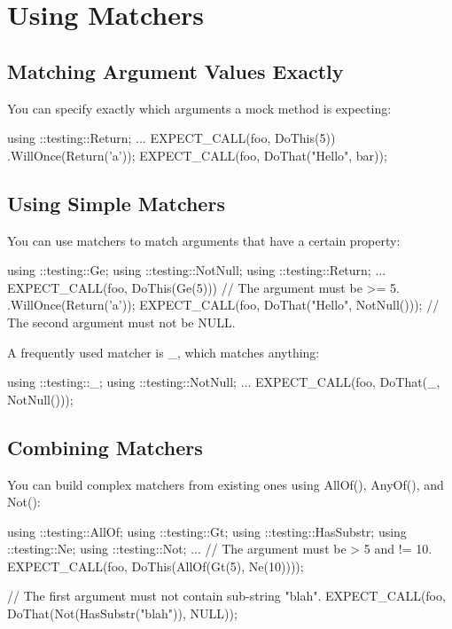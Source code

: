 \section*{Using Matchers}

\subsection*{Matching Argument Values Exactly}

You can specify exactly which arguments a mock method is expecting\+:


\begin{DoxyCode}
using ::testing::Return;
...
  EXPECT\_CALL(foo, DoThis(5))
      .WillOnce(Return('a'));
  EXPECT\_CALL(foo, DoThat("Hello", bar));
\end{DoxyCode}


\subsection*{Using Simple Matchers}

You can use matchers to match arguments that have a certain property\+:


\begin{DoxyCode}
using ::testing::Ge;
using ::testing::NotNull;
using ::testing::Return;
...
  EXPECT\_CALL(foo, DoThis(Ge(5)))  // The argument must be >= 5.
      .WillOnce(Return('a'));
  EXPECT\_CALL(foo, DoThat("Hello", NotNull()));
  // The second argument must not be NULL.
\end{DoxyCode}


A frequently used matcher is {\ttfamily \+\_\+}, which matches anything\+:


\begin{DoxyCode}
using ::testing::\_;
using ::testing::NotNull;
...
  EXPECT\_CALL(foo, DoThat(\_, NotNull()));
\end{DoxyCode}


\subsection*{Combining Matchers}

You can build complex matchers from existing ones using {\ttfamily All\+Of()}, {\ttfamily Any\+Of()}, and {\ttfamily Not()}\+:


\begin{DoxyCode}
using ::testing::AllOf;
using ::testing::Gt;
using ::testing::HasSubstr;
using ::testing::Ne;
using ::testing::Not;
...
  // The argument must be > 5 and != 10.
  EXPECT\_CALL(foo, DoThis(AllOf(Gt(5),
                                Ne(10))));

  // The first argument must not contain sub-string "blah".
  EXPECT\_CALL(foo, DoThat(Not(HasSubstr("blah")),
                          NULL));
\end{DoxyCode}


